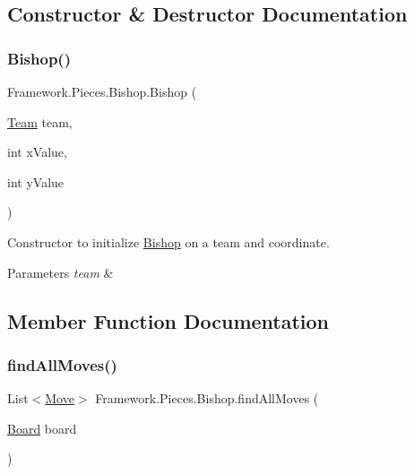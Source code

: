 \subsection{Constructor \& Destructor Documentation}
\hypertarget{class_framework_1_1_pieces_1_1_bishop_a3396bd8dc296ef4648567b18fdc23639}{}\label{class_framework_1_1_pieces_1_1_bishop_a3396bd8dc296ef4648567b18fdc23639} 
\subsubsection{\texorpdfstring{Bishop()}{Bishop()}}
{\footnotesize\ttfamily Framework.\+Pieces.\+Bishop.\+Bishop (\begin{DoxyParamCaption}\item[{\hyperlink{class_framework_1_1_team}{Team}}]{team,  }\item[{int}]{x\+Value,  }\item[{int}]{y\+Value }\end{DoxyParamCaption})}

Constructor to initialize \hyperlink{class_framework_1_1_pieces_1_1_bishop}{Bishop} on a team and coordinate. 
\begin{DoxyParams}{Parameters}
{\em team} & \\
\hline
\end{DoxyParams}


\subsection{Member Function Documentation}
\hypertarget{class_framework_1_1_pieces_1_1_bishop_a0f8de4fc5aad49e30d1bb08c87d67d86}{}\label{class_framework_1_1_pieces_1_1_bishop_a0f8de4fc5aad49e30d1bb08c87d67d86} 
\subsubsection{\texorpdfstring{find\+All\+Moves()}{findAllMoves()}}
{\footnotesize\ttfamily List$<$\hyperlink{class_framework_1_1_move}{Move}$>$ Framework.\+Pieces.\+Bishop.\+find\+All\+Moves (\begin{DoxyParamCaption}\item[{\hyperlink{class_framework_1_1_board}{Board}}]{board }\end{DoxyParamCaption})}

